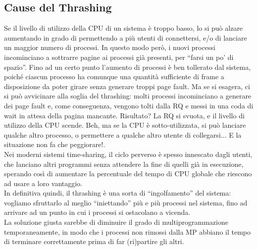 \subsection{Cause del Thrashing}
Se il livello di utilizzo della CPU di un sistema è troppo basso, lo si può alzare aumentando in grado di permettendo a più utenti di connettersi, e/o di lanciare un maggior numero di processi. In questo modo però, i nuovi processi incominciano a sottrarre pagine ai processi già presenti, per “farsi un po' di spazio”. Fino ad un certo punto l’aumento di processi è ben tollerato dal sistema, poiché ciascun processo ha comunque una quantità sufficiente di frame a disposizione da poter girare senza generare troppi page fault. Ma se si esagera, ci si può avvicinare alla soglia del thrashing: molti processi incominciano a generare dei page fault e, come conseguenza, vengono tolti dalla RQ e messi in una coda di wait in attesa della pagina mancante. Risultato? La RQ si svuota, e il livello di utilizzo della CPU scende. Beh, ma se la CPU è sotto-utilizzata, si può lanciare qualche altro processo, o permettere a qualche altro utente di collegarsi... E la situazione non fa che peggiorare!.\\
Nei moderni sistemi time-sharing, il ciclo perverso è spesso innescato dagli utenti, che lanciano altri programmi senza attendere la fine di quelli già in esecuzione, sperando così di aumentare la percentuale del tempo di CPU globale che riescono ad usare a loro vantaggio.\\
In definitiva quindi, il thrashing è una sorta di “ingolfamento” del sistema: vogliamo sfruttarlo al meglio “iniettando” più e più processi nel sistema, fino ad arrivare ad un punto in cui i processi si ostacolano a vicenda.\\
La soluzione giusta sarebbe di diminuire il grado di multiprogrammazione temporaneamente, in modo che i processi non rimossi dalla MP abbiano il tempo di terminare correttamente prima di far (ri)partire gli altri.\\




